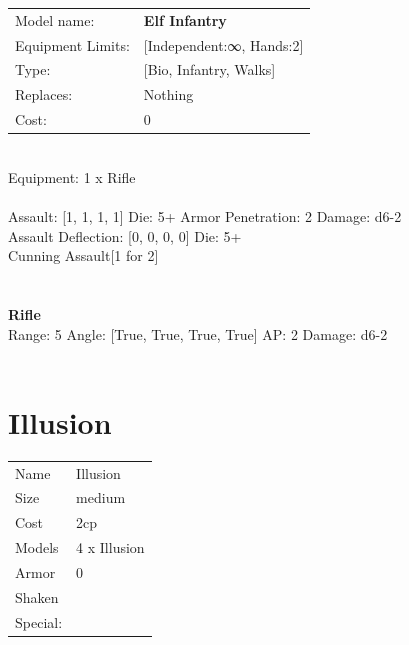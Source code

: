 \noindent
\begin{tabular}{ll}
Model name: &{\bf Elf Infantry } \\
Equipment Limits: &[Independent:∞, Hands:2] \\
Type: &[Bio, Infantry, Walks] \\
Replaces: &Nothing \\
Cost: & 0\\
\end{tabular}
\ \\
Equipment: 1 x Rifle \\
\ \\
Assault: [1, 1, 1, 1] Die: 5+ Armor Penetration: 2 Damage: d6-2 \\
Assault Deflection: [0, 0, 0, 0] Die: 5+\\
\indent Cunning Assault[1 for 2]\\ 
 
\ \\

\ \\
{\bf Rifle } \\



Range: 5  Angle: [True, True, True, True] AP: 2 Damage: d6-2 \\




 
\ \\













\clearpage

\section{ Illusion }

\begin{tabular}{ll}
  Name & Illusion \\
  Size & medium\\
  Cost & 2cp\\
  Models & 4 x Illusion\\
  Armor & 0\\
  Shaken & \\
  Special: \\
\end{tabular}

